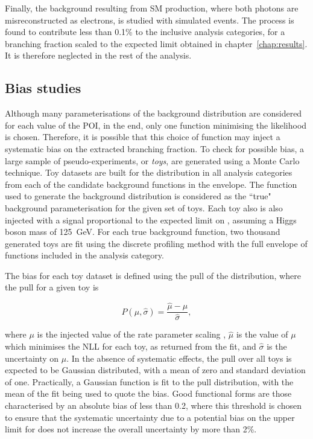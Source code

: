 Finally, the background resulting from SM \Hgg production, where both photons are misreconstructed as electrons, is studied with simulated events. The process is found to contribute less than 0.1\% to the inclusive analysis categories, for a \Hee branching fraction scaled to the expected limit obtained in chapter~\ref{chap:results}. It is therefore neglected in the rest of the analysis.


\subsection{Bias studies}
\label{subsec:hee_bias_studies}

Although many parameterisations of the background \mee distribution are considered for each value of the POI, in the end, only one function minimising the likelihood is chosen. Therefore, it is possible that this choice of function may inject a systematic bias on the extracted \Hee branching fraction. To check for possible bias, a large sample of pseudo-experiments, or \textit{toys}, are generated using a Monte Carlo technique. Toy datasets are built for the \mee distribution in all analysis categories from each of the candidate background functions in the envelope. The function used to generate the background \mee distribution is considered as the ``true" background parameterisation for the given set of toys. Each toy also is also injected with a signal proportional to the expected limit on \BHee, assuming a Higgs boson mass of 125~GeV. For each true background function, two thousand generated toys are fit using the discrete profiling method with the full envelope of functions included in the analysis category. 

The bias for each toy dataset is defined using the pull of the distribution, where the pull for a given toy is

\begin{equation}\label{eqn:hee_bias}
    P(\mu,\hat{\sigma}) = \frac{\hat{\mu}-\mu}{\hat{\sigma}},
\end{equation}



\noindent where $\mu$ is the injected value of the rate parameter scaling \BHee, $\hat{\mu}$ is the value of $\mu$ which minimises the NLL for each toy, as returned from the fit, and $\hat{\sigma}$ is the uncertainty on $\hat{\mu}$. In the absence of systematic effects, the pull over all toys is expected to be Gaussian distributed, with a mean of zero and standard deviation of one. Practically, a Gaussian function is fit to the pull distribution, with the mean of the fit being used to quote the bias.  
Good functional forms are those characterised by an absolute bias of less than 0.2, where this threshold is chosen to ensure that the systematic uncertainty due to a potential bias on the upper limit for \BHee does not increase the overall uncertainty by more than 2\%.

